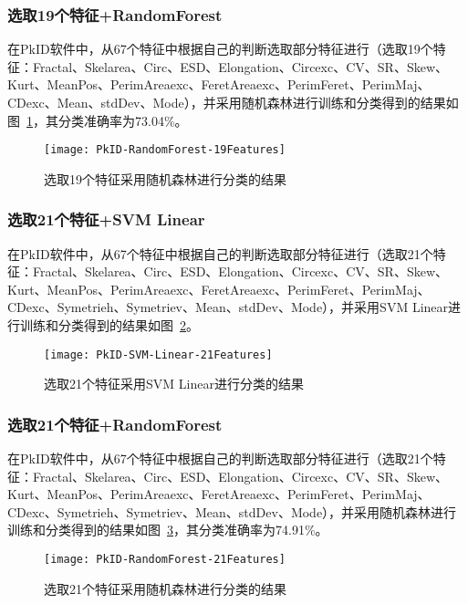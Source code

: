 \subsubsection{选取19个特征+RandomForest}
在PkID软件中，从67个特征中根据自己的判断选取部分特征进行（选取19个特征：Fractal、Skelarea、Circ、ESD、Elongation、Circexc、CV、SR、Skew、Kurt、MeanPos、PerimAreaexc、FeretAreaexc、PerimFeret、PerimMaj、CDexc、Mean、stdDev、Mode），并采用随机森林进行训练和分类得到的结果如图~\ref{fig:PkID-RandomForest-19Features}，其分类准确率为73.04\%。

\begin{figure}[!ht]
\centering
\texttt{[image: PkID-RandomForest-19Features]}
\caption{选取19个特征采用随机森林进行分类的结果}
\label{fig:PkID-RandomForest-19Features}
\end{figure}

\subsubsection{选取21个特征+SVM Linear}
在PkID软件中，从67个特征中根据自己的判断选取部分特征进行（选取21个特征：Fractal、Skelarea、Circ、ESD、Elongation、Circexc、CV、SR、Skew、Kurt、MeanPos、PerimAreaexc、FeretAreaexc、PerimFeret、PerimMaj、CDexc、Symetrieh、Symetriev、Mean、stdDev、Mode），并采用SVM Linear进行训练和分类得到的结果如图~\ref{fig:PkID-SVM-Linear-21Features}。

\begin{figure}[!ht]
\centering
\texttt{[image: PkID-SVM-Linear-21Features]}
\caption{选取21个特征采用SVM Linear进行分类的结果}
\label{fig:PkID-SVM-Linear-21Features}
\end{figure}

\subsubsection{选取21个特征+RandomForest}
在PkID软件中，从67个特征中根据自己的判断选取部分特征进行（选取21个特征：Fractal、Skelarea、Circ、ESD、Elongation、Circexc、CV、SR、Skew、Kurt、MeanPos、PerimAreaexc、FeretAreaexc、PerimFeret、PerimMaj、CDexc、Symetrieh、Symetriev、Mean、stdDev、Mode），并采用随机森林进行训练和分类得到的结果如图~\ref{fig:PkID-RandomForest-21Features}，其分类准确率为74.91\%。

\begin{figure}[!ht]
\centering
\texttt{[image: PkID-RandomForest-21Features]}
\caption{选取21个特征采用随机森林进行分类的结果}
\label{fig:PkID-RandomForest-21Features}
\end{figure}

